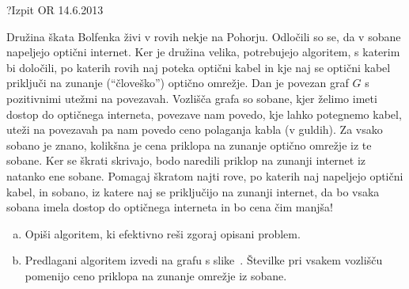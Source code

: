 \begin{naloga}{?}{Izpit OR 14.6.2013}
\begin{vprasanje}
Družina škata Bolfenka živi v rovih nekje na Pohorju.
Odločili so se, da v sobane napeljejo optični internet.
Ker je družina velika, potrebujejo algoritem, s katerim bi določili,
po katerih rovih naj poteka optični kabel
in kje naj se optični kabel priključi
na zunanje (``človeško'') optično omrežje.
Dan je povezan graf $G$ s pozitivnimi utežmi na povezavah.
Vozlišča grafa so sobane, kjer želimo imeti dostop do optičnega interneta,
povezave nam povedo, kje lahko potegnemo kabel,
uteži na povezavah pa nam povedo ceno polaganja kabla (v guldih).
Za vsako sobano je znano,
kolikšna je cena priklopa na zunanje optično omrežje iz te sobane.
Ker se škrati skrivajo,
bodo naredili priklop na zunanji internet iz natanko ene sobane.
Pomagaj škratom najti rove, po katerih naj napeljejo optični kabel,
in sobano, iz katere naj se priključijo na zunanji internet,
da bo vsaka sobana imela dostop do optičnega interneta in bo cena čim manjša!

\begin{enumerate}[(a)]
\item Opiši algoritem, ki efektivno reši zgoraj opisani problem.

\item Predlagani algoritem izvedi na grafu s slike~\fig{}.
Številke pri vsakem vozlišču
pomenijo ceno priklopa na zunanje omrežje iz sobane.
\end{enumerate}

\begin{slika}
\pgfslika
{}
\end{slika}
\end{vprasanje}
\begin{odgovor}
\end{odgovor}
\end{naloga}
